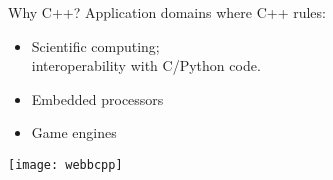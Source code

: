 \begin{block}{Why C++?}
  \label{sl:webb}
  Application domains where C++ rules:
  \begin{multicols}{2}
  \begin{itemize}
  \item Scientific computing;\\
    interoperability with C/Python code.
  \item Embedded processors
  \item Game engines
  \end{itemize}
  \columnbreak
  \texttt{[image: webbcpp]}
  \end{multicols}
\end{block}

\endinput

\Level 0 {Further reading}

Tutorial, assignments:
\url{http://www.cppforschool.com/}

Problems to practice:
\url{http://www.spoj.com/problems/classical/}

